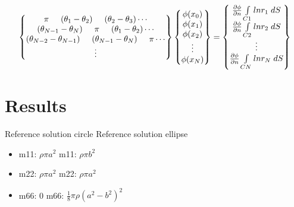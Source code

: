 \documentclass[a4paper,norsk]{article}
\begin{document}
\begin{align*}
\begin{Bmatrix}
\pi \hspace{5mm} (\theta_1 - \theta_2) \hspace{5mm} (\theta_2 - \theta_3) \cdots \\
(\theta_{N-1} - \theta_N)  \hspace{5mm} \pi \hspace{5mm}(\theta_1 - \theta_2) \cdots \\
(\theta_{N-2} - \theta_{N-1})  \hspace{5mm} (\theta_{N-1} - \theta_N) \hspace{5mm} \pi \cdots \\
\vdots 
\end{Bmatrix}
\begin{Bmatrix}
\phi(x_0) \\
\phi(x_1) \\
\phi(x_2) \\
\vdots \\
\phi(x_N)
\end{Bmatrix}
=
\begin{Bmatrix}
\frac{\partial \phi}{\partial n} \int\limits_{C1} ln r_1 \hspace{1mm} dS \\
\frac{\partial \phi}{\partial n} \int\limits_{C2} ln r_2 \hspace{1mm} dS \\
\vdots \\
\frac{\partial \phi}{\partial n} \int\limits_{CN} ln r_N \hspace{1mm} dS
\end{Bmatrix}
\end{align*} 

\newpage
\section*{Results}
Reference solution circle \hspace{2cm} Reference solution ellipse
\begin{itemize}
\item m11: $\rho \pi a^2$   \hspace{3.3cm}    m11: $\rho \pi b^2$
\item m22: $\rho \pi  a^2$  \hspace{3.3cm}    m22: $\rho \pi a^2$
\item m66: 0                \hspace{3.8cm}    m66: $\frac{1}{8}\pi \rho (a^2 - b^2)^2 $  
\end{itemize}
\end{document}
